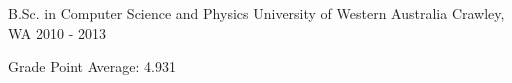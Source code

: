 
\begin{cventries}

  \cventry
    {B.Sc. in Computer Science and Physics} %
    {University of Western Australia} %
    {Crawley, WA} %
    {2010 - 2013} %
    {
      \begin{cvitems} %
        \item {Grade Point Average: 4.931}
      \end{cvitems}
    }

\end{cventries}
